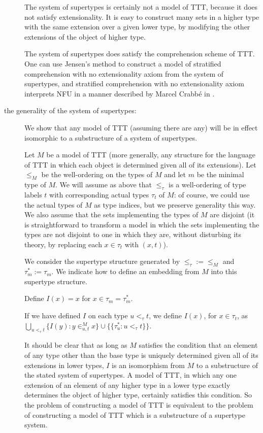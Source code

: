 \documentclass[112pt]{article}
\begin{document}
\begin{description}
The system of supertypes is certainly not a model of TTT, because it does not satisfy extensionality.  It is easy to construct
many sets in a higher type with the same extension over a given lower type, by modifying the other extensions of the object of higher type.

The system of supertypes does satisfy the comprehension scheme of TTT.  One can use Jensen's method to construct a model of stratified comprehension with no extensionality axiom from the system of supertypes, and stratified comprehension with no extensionality axiom interprets NFU in a manner described by Marcel Crabb\'e in \cite{marcelsf}.

\item[the generality of the system of supertypes:]  We show that any model of TTT (assuming there are any) will be in effect isomorphic to a substructure of a system of supertypes.

Let $M$ be a model of TTT (more generally, any structure for the language of TTT in which each object is determined given all of its extensions).  Let $\leq_M$ be the well-ordering on the types of $M$ and let $m$ be the minimal type of $M$.  We will assume as above that $\leq_\tau$ is a well-ordering of type labels $t$ with corresponding actual types $\tau_t$ of $M$:  of course, we could use the actual types of $M$ as type indices, but we preserve generality this way.    We also assume that the sets implementing the types of $M$ are disjoint (it is straightforward to transform a model in which the sets implementing the types are not disjoint to one in which they are, without disturbing its theory, by replacing each $x \in \tau_t$ with $(x,t)$).

We consider the supertype structure generated by $\leq_\tau:=\leq_M$ and $\tau^*_m := \tau_m$.  We indicate how to define an embedding from $M$ into this supertype structure.

Define $I(x) = x$ for $x \in \tau_m = \tau^*_m$.

If we have defined $I$ on each type $u <_\tau t$, we define $I(x)$, for $x \in \tau_t$, as
$\bigcup_{u <_\tau t} \{I(y):y \in^M_{u,t} x\} \cup \{\{\tau^*_u:u <_\tau t\}\}$.

It should be clear that as long as $M$ satisfies the condition that an element of any type other than the base type is uniquely determined given all of its extensions in lower types, $I$ is an isomorphism from $M$ to a substructure of the stated system of supertypes.  A model of TTT, in which any one extension of an element of any higher type in a lower type exactly determines the object of higher type, certainly satisfies this condition.  So the problem of constructing a model of TTT is equivalent to the problem of constructing a model of TTT which is a substructure of a supertype system.


\end{description}
\end{document}
